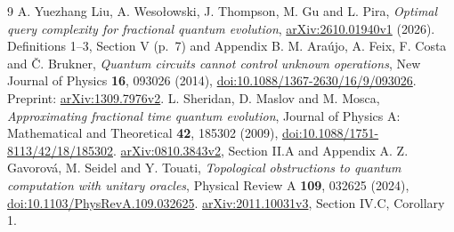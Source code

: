 \documentclass[11pt]{article}
\begin{document}
\begin{thebibliography}{9}
A. Yuezhang Liu, A. Weso\l{}owski, J. Thompson, M. Gu and L. Pira,
\emph{Optimal query complexity for fractional quantum evolution},
\href{https://arxiv.org/abs/2610.01940v1}{arXiv:2610.01940v1} (2026).
Definitions 1--3, Section V (p.~7) and Appendix B.
M. Ara\'ujo, A. Feix, F. Costa and \v C. Brukner,
\emph{Quantum circuits cannot control unknown operations},
New Journal of Physics \textbf{16}, 093026 (2014),
\href{https://doi.org/10.1088/1367-2630/16/9/093026}{doi:10.1088/1367-2630/16/9/093026}.
Preprint: \href{https://arxiv.org/abs/1309.7976v2}{arXiv:1309.7976v2}.
L. Sheridan, D. Maslov and M. Mosca,
\emph{Approximating fractional time quantum evolution},
Journal of Physics A: Mathematical and Theoretical \textbf{42}, 185302 (2009),
\href{https://doi.org/10.1088/1751-8113/42/18/185302}{doi:10.1088/1751-8113/42/18/185302}.
\href{https://arxiv.org/abs/0810.3843v2}{arXiv:0810.3843v2},
Section II.A and Appendix A.
Z. Gavorov\'a, M. Seidel and Y. Touati,
\emph{Topological obstructions to quantum computation with unitary oracles},
Physical Review A \textbf{109}, 032625 (2024),
\href{https://doi.org/10.1103/PhysRevA.109.032625}{doi:10.1103/PhysRevA.109.032625}.
\href{https://arxiv.org/abs/2011.10031v3}{arXiv:2011.10031v3},
Section IV.C, Corollary 1.
\end{thebibliography}
\end{document}
